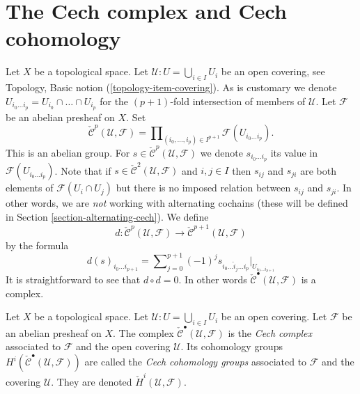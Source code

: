 \section{The Cech complex and Cech cohomology}
\label{section-cech}

\noindent
Let $X$ be a topological space.
Let $\mathcal{U} : U = \bigcup_{i \in I} U_i$ be an open covering,
see Topology, Basic notion (\ref{topology-item-covering}).
As is customary we denote
$U_{i_0\ldots i_p} = U_{i_0} \cap \ldots \cap U_{i_p}$ for the
$(p + 1)$-fold intersection of members of $\mathcal{U}$.
Let $\mathcal{F}$ be an abelian presheaf on $X$.
Set
$$
\check{\mathcal{C}}^p(\mathcal{U}, \mathcal{F})
=
\prod\nolimits_{(i_0, \ldots, i_p) \in I^{p + 1}}
\mathcal{F}(U_{i_0\ldots i_p}).
$$
This is an abelian group. For
$s \in \check{\mathcal{C}}^p(\mathcal{U}, \mathcal{F})$ we denote
$s_{i_0\ldots i_p}$ its value in $\mathcal{F}(U_{i_0\ldots i_p})$.
Note that if $s \in \check{\mathcal{C}}^2(\mathcal{U}, \mathcal{F})$
and $i, j \in I$ then $s_{ij}$ and $s_{ji}$ are both elements
of $\mathcal{F}(U_i \cap U_j)$ but there is no imposed
relation between $s_{ij}$ and $s_{ji}$. In other words, we are {\it not}
working with alternating cochains (these will be defined
in Section \ref{section-alternating-cech}). We define
$$
d : \check{\mathcal{C}}^p(\mathcal{U}, \mathcal{F})
\longrightarrow
\check{\mathcal{C}}^{p + 1}(\mathcal{U}, \mathcal{F})
$$
by the formula
\begin{equation}
\label{equation-d-cech}
d(s)_{i_0\ldots i_{p + 1}}
=
\sum\nolimits_{j = 0}^{p + 1}
(-1)^j
s_{i_0\ldots \hat i_j \ldots i_p}|_{U_{i_0\ldots i_{p + 1}}}
\end{equation}
It is straightforward to see that $d \circ d = 0$. In other words
$\check{\mathcal{C}}^\bullet(\mathcal{U}, \mathcal{F})$ is a complex.

\begin{definition}
\label{definition-cech-complex}
Let $X$ be a topological space.
Let $\mathcal{U} : U = \bigcup_{i \in I} U_i$ be an open covering.
Let $\mathcal{F}$ be an abelian presheaf on $X$.
The complex $\check{\mathcal{C}}^\bullet(\mathcal{U}, \mathcal{F})$
is the {\it Cech complex} associated to $\mathcal{F}$ and the
open covering $\mathcal{U}$. Its cohomology groups
$H^i(\check{\mathcal{C}}^\bullet(\mathcal{U}, \mathcal{F}))$ are
called the {\it Cech cohomology groups} associated to
$\mathcal{F}$ and the covering $\mathcal{U}$.
They are denoted $\check H^i(\mathcal{U}, \mathcal{F})$.
\end{definition}

